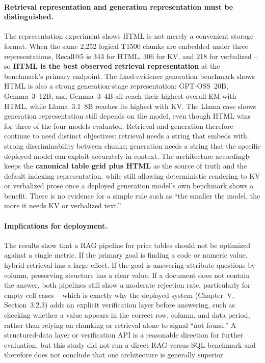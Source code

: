 \documentclass[11pt,a4paper]{article}
\begin{document}
\paragraph{Retrieval representation and generation representation must be
distinguished.}
The representation experiment shows HTML is not merely a convenient storage
format. When the same 2,252 logical T1500 chunks are embedded under three
representations, Recall@5 is 343 for HTML, 306 for KV, and 218 for
verbalized -- so \textbf{HTML is the best observed retrieval
representation} at the benchmark's primary endpoint. The fixed-evidence
generation benchmark shows HTML is also a strong generation-stage
representation: GPT-OSS~20B, Gemma~3~12B, and Gemma~3~4B all reach their
highest overall EM with HTML, while Llama~3.1~8B reaches its highest with
KV. The Llama case shows generation representation still depends on the
model, even though HTML wins for three of the four models evaluated.
Retrieval and generation therefore continue to need distinct objectives:
retrieval needs a string that embeds with strong discriminability between
chunks; generation needs a string that the specific deployed model can
exploit accurately in context. The architecture accordingly keeps the
\textbf{canonical table grid plus HTML} as the source of truth and the
default indexing representation, while still allowing deterministic
rendering to KV or verbalized prose once a deployed generation model's own
benchmark shows a benefit. There is no evidence for a simple rule such as
``the smaller the model, the more it needs KV or verbalized text.''

\paragraph{Implications for deployment.}
The results show that a RAG pipeline for price tables should not be
optimized against a single metric. If the primary goal is finding a code or
numeric value, hybrid retrieval has a large effect. If the goal is
answering attribute questions by column, preserving structure has a clear
value. If a document does not contain the answer, both pipelines still show
a moderate rejection rate, particularly for empty-cell cases -- which is
exactly why the deployed system (Chapter~V, Section~3.2.3) adds an explicit
verification layer before answering, such as checking whether a value
appears in the correct row, column, and data period, rather than relying on
chunking or retrieval alone to signal ``not found.'' A structured-data layer
or verification API is a reasonable direction for further evaluation, but
this study did not run a direct RAG-versus-SQL benchmark and therefore does
not conclude that one architecture is generally superior.
\end{document}
